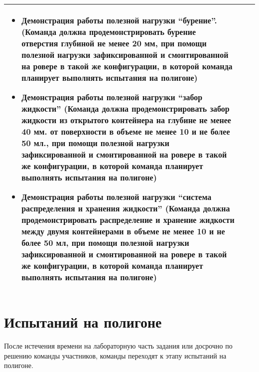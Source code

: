 \begin{longtable}{|p{0.5cm}|p{3.5cm}|p{10.5cm}|}
\begin{itemize}
        \item Демонстрация работы полезной нагрузки “бурение”. (Команда должна продемонстрировать бурение отверстия глубиной не менее 20 мм, при помощи полезной нагрузки зафиксированной и смонтированной на ровере в такой же конфигурации, в которой команда планирует выполнять испытания на полигоне)
        \item Демонстрация работы полезной нагрузки “забор жидкости” (Команда должна продемонстрировать забор жидкости из открытого контейнера на глубине не менее 40 мм. от поверхности в объеме не менее 10 и не более 50 мл., при помощи полезной нагрузки зафиксированной и смонтированной на ровере в такой же конфигурации, в которой команда планирует выполнять испытания на полигоне)
        \item Демонстрация работы полезной нагрузки “система распределения и хранения жидкости” (Команда должна продемонстрировать распределение и хранение жидкости между двумя контейнерами в объеме не менее 10 и не более 50 мл, при помощи полезной нагрузки зафиксированной и смонтированной на ровере в такой же конфигурации, в которой команда планирует выполнять испытания на полигоне)
    \end{itemize} \\
    \hline
\end{longtable}

\section{Испытаний на полигоне}

После истечения времени на лабораторную часть задания или досрочно по решению команды участников, команды переходят к этапу испытаний на полигоне. 

